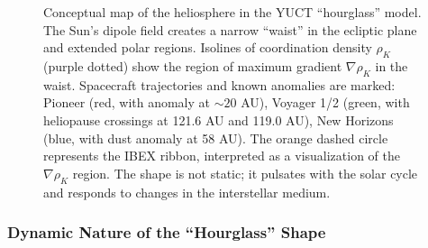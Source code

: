 \documentclass[12pt,a4paper]{article}
\theoremstyle{remark}
\begin{document}
\begin{figure}[htbp]
		\caption{Conceptual map of the heliosphere in the YUCT ``hourglass'' model. The Sun's dipole field creates a narrow ``waist'' in the ecliptic plane and extended polar regions. Isolines of coordination density \(\rho_K\) (purple dotted) show the region of maximum gradient $\nabla\rho_K$ in the waist. Spacecraft trajectories and known anomalies are marked: Pioneer (red, with anomaly at $\sim20$ AU), Voyager 1/2 (green, with heliopause crossings at 121.6 AU and 119.0 AU), New Horizons (blue, with dust anomaly at 58 AU). The orange dashed circle represents the IBEX ribbon, interpreted as a visualization of the $\nabla\rho_K$ region. The shape is not static; it pulsates with the solar cycle and responds to changes in the interstellar medium.}
		\label{fig:coord:heliosphere_hourglass}
	\end{figure}
	
	\subsubsection{Dynamic Nature of the ``Hourglass'' Shape}
	\label{subsubsec:coord:dynamic}
	
\end{document}
